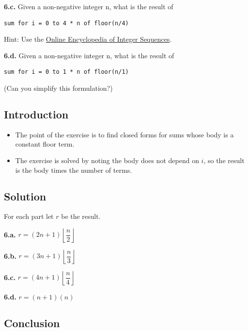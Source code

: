 \documentclass[12pt]{article}
\begin{document}
\textbf{6.c.} Given a non-negative integer n, what is the result of

\begin{verbatim}
sum for i = 0 to 4 * n of floor(n/4)
\end{verbatim}

Hint: Use the
\href{https://oeis.org/}{Online Encyclopedia of Integer Sequences}.

\textbf{6.d.} Given a non-negative integer n, what is the result of

\begin{verbatim}
sum for i = 0 to 1 * n of floor(n/1)
\end{verbatim}

(Can you simplify this formulation?)


\subsection{Introduction}

\begin{itemize}

\item
  The point of the exercise is to find closed forms for sums whose body is a constant floor term.

\item
  The exercise is solved by noting the body does not depend on $i$, so the result is the body times the number of terms.

\end{itemize}


\subsection{Solution}

For each part let $r$ be the result.

\textbf{6.a.} $r = (2n + 1)\left\lfloor \dfrac{n}{2} \right\rfloor$

\textbf{6.b.} $r = (3n + 1)\left\lfloor \dfrac{n}{3} \right\rfloor$

\textbf{6.c.} $r = (4n + 1)\left\lfloor \dfrac{n}{4} \right\rfloor$

\textbf{6.d.} $r = (n + 1)(n)$


\subsection{Conclusion}
\end{document}
